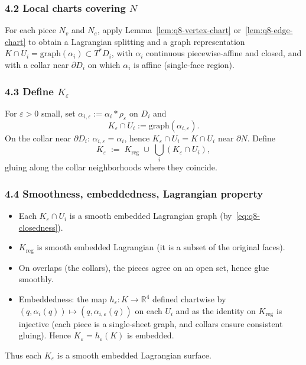 \subsubsection*{4.2 Local charts covering $N$}
For each piece $N_v$ and $N_e$, apply Lemma~\ref{lem:q8-vertex-chart}
or~\ref{lem:q8-edge-chart} to obtain a Lagrangian splitting and a graph representation
$K\cap U_i = \mathrm{graph}(\alpha_i)\subset T^*D_i$,
with $\alpha_i$ continuous piecewise-affine and closed,
and with a collar near $\partial D_i$ on which $\alpha_i$ is affine (single-face region).

\subsubsection*{4.3 Define $K_\varepsilon$}
For $\varepsilon>0$ small, set $\alpha_{i,\varepsilon}:=\alpha_i\ast\rho_\varepsilon$ on $D_i$ and
\[
K_\varepsilon\cap U_i := \mathrm{graph}(\alpha_{i,\varepsilon}).
\]
On the collar near $\partial D_i$: $\alpha_{i,\varepsilon}=\alpha_i$, hence
$K_\varepsilon\cap U_i = K\cap U_i$ near $\partial N$.
Define
\[
K_\varepsilon \;:=\; K_{\mathrm{reg}} \;\cup\; \bigcup_i (K_\varepsilon\cap U_i),
\]
gluing along the collar neighborhoods where they coincide.

\subsubsection*{4.4 Smoothness, embeddedness, Lagrangian property}
\begin{itemize}
\item Each $K_\varepsilon\cap U_i$ is a smooth embedded Lagrangian graph
  (by~\eqref{eq:q8-closedness}).
\item $K_{\mathrm{reg}}$ is smooth embedded Lagrangian (it is a subset of the original faces).
\item On overlaps (the collars), the pieces agree on an open set, hence glue smoothly.
\item Embeddedness: the map $h_\varepsilon\colon K\to\mathbb R^4$ defined chartwise by
  $(q,\alpha_i(q))\mapsto(q,\alpha_{i,\varepsilon}(q))$ on each $U_i$ and as the identity
  on $K_{\mathrm{reg}}$ is injective (each piece is a single-sheet graph,
  and collars ensure consistent gluing).
  Hence $K_\varepsilon=h_\varepsilon(K)$ is embedded.
\end{itemize}
Thus each $K_\varepsilon$ is a smooth embedded Lagrangian surface.


